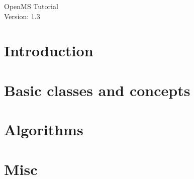 \documentclass[a4paper]{article}
\begin{document}
\begin{titlepage}
\vspace*{7cm}
\begin{center}
{\Large OpenMS Tutorial\\[1ex]\large Version: 1.3 }\\
\end{center}
\end{titlepage}


\setcounter{tocdepth}{2}
\tableofcontents
\pagebreak

\section{Introduction}

	
	\pagebreak
	
	\pagebreak
	


\pagebreak
\section{Basic classes and concepts}

	
	\pagebreak
	
	\pagebreak
	
	\pagebreak
	
	\pagebreak
	
	\pagebreak
	


\pagebreak
\section{Algorithms}

	
	\pagebreak
	
	\pagebreak
	
	\pagebreak
	

\pagebreak
\section{Misc}

	
	\pagebreak
	
	\pagebreak
	
	\pagebreak
	
\end{document}

